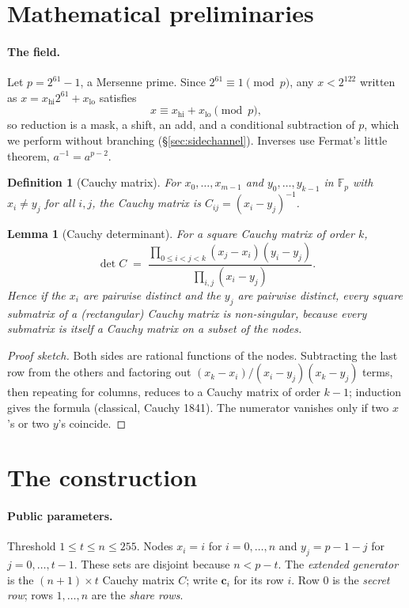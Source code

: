 \documentclass[11pt]{article}
\newtheorem{lemma}{Lemma}
\newtheorem{definition}{Definition}
\theoremstyle{remark}
\newcommand{\F}{\mathbb{F}_p}
\newcommand{\vect}[1]{\mathbf{#1}}
\begin{document}
\section{Mathematical preliminaries}

\paragraph{The field.} Let $p = 2^{61}-1$, a Mersenne prime. Since
$2^{61}\equiv 1 \pmod p$, any $x<2^{122}$ written as $x = x_{\mathrm{hi}}2^{61}+x_{\mathrm{lo}}$ satisfies
\begin{equation}\label{eq:reduce}
x \equiv x_{\mathrm{hi}} + x_{\mathrm{lo}} \pmod p ,
\end{equation}
so reduction is a mask, a shift, an add, and a conditional subtraction of $p$,
which we perform without branching (\S\ref{sec:sidechannel}).
Inverses use Fermat's little theorem, $a^{-1}=a^{p-2}$.

\begin{definition}[Cauchy matrix]
For $x_0,\dots,x_{m-1}$ and $y_0,\dots,y_{k-1}$ in $\F$ with $x_i\neq y_j$ for all $i,j$,
the Cauchy matrix is $C_{ij} = (x_i-y_j)^{-1}$.
\end{definition}

\begin{lemma}[Cauchy determinant]\label{lem:cauchy}
For a square Cauchy matrix of order $k$,
\[
\det C \;=\; \frac{\prod_{0\le i<j<k}(x_j-x_i)(y_i-y_j)}{\prod_{i,j}(x_i-y_j)} .
\]
Hence if the $x_i$ are pairwise distinct and the $y_j$ are pairwise distinct,
\emph{every} square submatrix of a (rectangular) Cauchy matrix is non-singular,
because every submatrix is itself a Cauchy matrix on a subset of the nodes.
\end{lemma}
\begin{proof}[Proof sketch]
Both sides are rational functions of the nodes. Subtracting the last row from the
others and factoring out $(x_k - x_i)/(x_i-y_j)(x_k-y_j)$ terms, then repeating
for columns, reduces to a Cauchy matrix of order $k-1$; induction gives the
formula (classical, Cauchy 1841). The numerator vanishes only if two $x$'s or
two $y$'s coincide.
\end{proof}

\section{The construction}

\paragraph{Public parameters.} Threshold $1\le t\le n\le 255$. Nodes
$x_i = i$ for $i=0,\dots,n$ and $y_j = p-1-j$ for $j=0,\dots,t-1$. These sets are
disjoint because $n < p-t$. The \emph{extended generator} is the $(n+1)\times t$
Cauchy matrix $C$; write $\vect c_i$ for its row $i$. Row $0$ is the
\emph{secret row}; rows $1,\dots,n$ are the \emph{share rows}.
\end{document}
